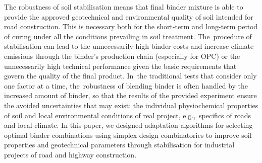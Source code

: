 \documentclass[materials,article,accept,pdftex,moreauthors]{Definitions/mdpi}
\begin{document}
The robustness of soil stabilisation means that final binder mixture is able to provide the approved geotechnical and environmental quality of soil intended for road construction. This is necessary both for the short-term and long-term period of curing under all the conditions prevailing in soil treatment. The~procedure of stabilisation can lead to the unnecessarily high binder costs and increase climate emissions through the binder's production chain (especially for OPC) or the unnecessarily high technical performance given the basic requirements that govern the quality of the final product. In~the traditional tests that consider only one factor at a time, the~robustness of blending binder is often handled by the increased amount of binder, so that the results of the provided experiment ensure the avoided uncertainties that may exist: the individual physiochemical properties of soil and local environmental conditions of real project, e.g.,~specifics of roads and local climate. In this paper, we designed adaptation algorithms for selecting optimal binder combinations using simplex design combinatorics to improve soil properties and geotechnical parameters through stabilisation for industrial projects of road and highway construction.

\vspace{6pt} 






\end{document}
